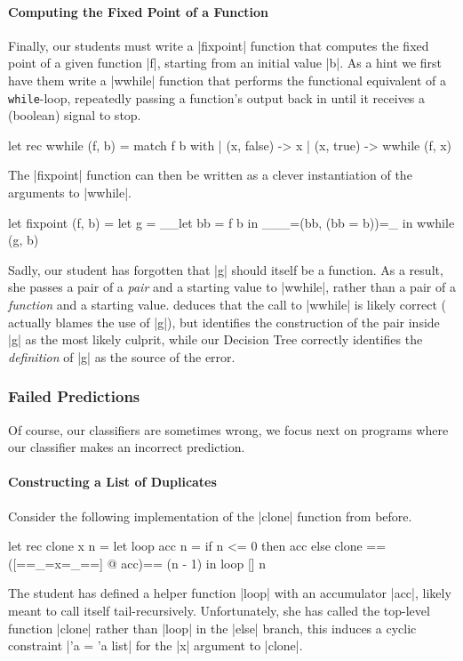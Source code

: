 \paragraph{Computing the Fixed Point of a Function}
Finally, our students must write a |fixpoint| function that computes the
fixed point of a given function |f|, starting from an initial value |b|.
%
As a hint we first have them write a |wwhile| function that performs the
functional equivalent of a \texttt{while}-loop, repeatedly passing a function's
output back in until it receives a (boolean) signal to stop.
%
\begin{ecode}
  let rec wwhile (f, b) =
    match f b with
    | (x, false) -> x
    | (x, true)  -> wwhile (f, x)
\end{ecode}
\lstset{firstnumber=last}
%
The |fixpoint| function can then be written as a clever instantiation of
the arguments to |wwhile|.
%
\begin{ecode}
  let fixpoint (f, b) =
    let g = __let bb = f b in ___=(bb, (bb = b))=_ in
    wwhile (g, b)
\end{ecode}
\lstset{firstnumber=1}
%
Sadly, our student has forgotten that |g| should itself be a function.
%
As a result, she passes a pair of a \emph{pair} and a starting value to
|wwhile|, rather than a pair of a \emph{function} and a starting value.
%
\sherrloc deduces that the call to |wwhile| is likely correct (\ocaml
actually blames the use of |g|), but identifies the construction of the
pair inside |g| as the most likely culprit, while our Decision Tree
correctly identifies the \emph{definition} of |g| as the source of the
error.


\subsubsection{Failed Predictions}
\label{sec:failed-predictions}
Of course, our classifiers are sometimes wrong, we focus next on programs
where our classifier makes an incorrect prediction.

\paragraph{Constructing a List of Duplicates}
Consider the following implementation of the |clone| function from
before.
%
\begin{ecode}
  let rec clone x n =
    let loop acc n =
      if n <= 0 then
        acc
      else
        clone ==([==_=x=_==] @ acc)== (n - 1) in
    loop [] n
\end{ecode}
%
The student has defined a helper function |loop| with an accumulator
|acc|, likely meant to call itself tail-recursively.
%
Unfortunately, she has called the top-level function |clone| rather than
|loop| in the |else| branch, this induces a cyclic constraint |'a = 'a list|
for the |x| argument to |clone|.

